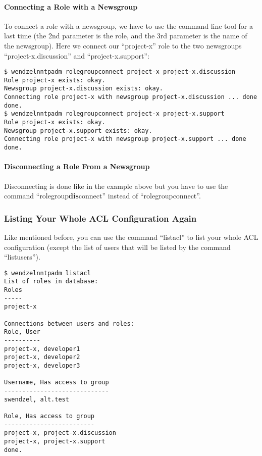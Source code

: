 \documentclass[12pt,fleqn,leqno]{scrbook}
\begin{document}
\hypertarget{connecting-a-role-with-a-newsgroup-1}{%
\paragraph{Connecting a Role with a
Newsgroup}\label{connecting-a-role-with-a-newsgroup-1}}

To connect a role with a newsgroup, we have to use the command line tool
for a last time (the 2nd parameter is the role, and the 3rd parameter is
the name of the newsgroup). Here we connect our ``project-x'' role to
the two newsgroups ``project-x.discussion'' and ``project-x.support'':

\begin{verbatim}
$ wendzelnntpadm rolegroupconnect project-x project-x.discussion
Role project-x exists: okay.
Newsgroup project-x.discussion exists: okay.
Connecting role project-x with newsgroup project-x.discussion ... done
done.
$ wendzelnntpadm rolegroupconnect project-x project-x.support
Role project-x exists: okay.
Newsgroup project-x.support exists: okay.
Connecting role project-x with newsgroup project-x.support ... done
done.
\end{verbatim}

\hypertarget{disconnecting-a-role-from-a-newsgroup-1}{%
\paragraph{Disconnecting a Role From a
Newsgroup}\label{disconnecting-a-role-from-a-newsgroup-1}}

Disconnecting is done like in the example above but you have to use the
command ``rolegroup\textbf{dis}connect'' instead of
``rolegroupconnect''.

\hypertarget{listing-your-whole-acl-configuration-again-1}{%
\subsubsection{Listing Your Whole ACL Configuration
Again}\label{listing-your-whole-acl-configuration-again-1}}

Like mentioned before, you can use the command ``listacl'' to list your
whole ACL configuration (except the list of users that will be listed by
the command ``listusers'').

\begin{verbatim}
$ wendzelnntpadm listacl
List of roles in database:
Roles
-----
project-x

Connections between users and roles:
Role, User
----------
project-x, developer1
project-x, developer2
project-x, developer3

Username, Has access to group
-----------------------------
swendzel, alt.test

Role, Has access to group
-------------------------
project-x, project-x.discussion
project-x, project-x.support
done.
\end{verbatim}
\end{document}
